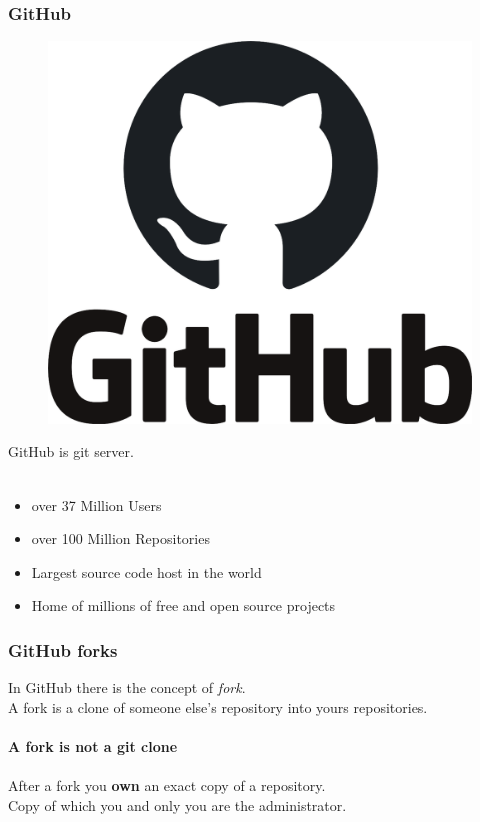 \documentclass{beamer}
\begin{document}
\begin{frame}
    \frametitle{GitHub}
    \begin{figure}
        \includegraphics[scale=0.075]{imgs/github-logo.png}
    \end{figure}
    GitHub is git server.\\
    \hfill \\
    \begin{itemize}
        \item over 37 Million Users
        \item over 100 Million Repositories 
        \item Largest source code host in the world
        \item Home of millions of free and open source projects 
    \end{itemize}
\end{frame}

\begin{frame}
    \frametitle{GitHub forks}
    In GitHub there is the concept of \textit{fork}.\\
    A fork is a clone of someone else's repository into yours repositories.\\
    \hfill \\
    \textbf{A fork is not a git clone}\\
    \hfill \\
    After a fork you \textbf{own} an exact copy of a repository.\\
    Copy of which you and only you are the administrator.\\  
\end{frame}
\end{document}
